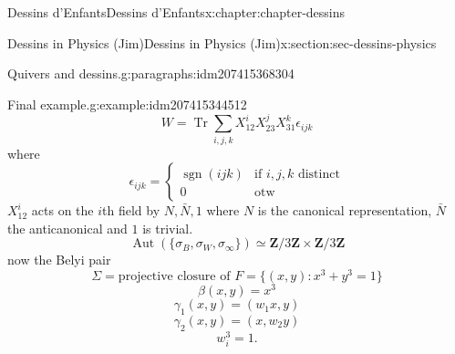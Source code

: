 \documentclass[oneside,10pt,]{book}
\numberwithin{equation}{section}
\newcommand{\ZZ}{\mathbf{Z}}
\DeclareMathOperator{\sgn}{sgn}
\DeclareMathOperator{\trace}{Tr}
\DeclareMathOperator{\Aut}{Aut}
\newcommand{\amp}{&}
\begin{document}
\begin{chapterptx}{Dessins d'Enfants}{}{Dessins d'Enfants}{}{}{x:chapter:chapter-dessins}
\begin{sectionptx}{Dessins in Physics (Jim)}{}{Dessins in Physics (Jim)}{}{}{x:section:sec-dessins-physics}
\begin{paragraphs}{Quivers and dessins.}{g:paragraphs:idm207415368304}
\begin{example}{Final example.}{g:example:idm207415344512}
\begin{equation*}
W = \trace \sum_{i,j,k} X_{12}^iX_{23}^j X_{31}^k \epsilon_{ijk}
\end{equation*}
where%
\begin{equation*}
\epsilon_{ijk} = \begin{cases} \sgn(ijk) \amp\text{if }i,j,k \text{ distinct}\\ 0 \amp\text{otw}\end{cases}
\end{equation*}
\(X_{12}^i\) acts on the \(i\)th field by \(N, \bar N, 1\) where \(N\) is the canonical representation, \(\bar N\) the anticanonical and \(1\) is trivial.%
\begin{equation*}
\Aut(\{\sigma_B,\sigma_W, \sigma_\infty\})  \simeq \ZZ/3\ZZ\times \ZZ/3\ZZ
\end{equation*}
now the Belyi pair%
\begin{equation*}
\Sigma = \text{projective closure of } F = \{(x,y) : x^3+ y^3 =1\}
\end{equation*}
%
\begin{equation*}
\beta(x,y) = x^3
\end{equation*}
%
\begin{equation*}
\gamma_1(x,y) = (w_1 x, y)
\end{equation*}
%
\begin{equation*}
\gamma_2(x,y) = (x,w_2  y)
\end{equation*}
%
\begin{equation*}
w_i^3 = 1\text{.}
\end{equation*}
%
\end{example}
\end{paragraphs}%
\end{sectionptx}
\end{chapterptx}
%
%
\typeout{************************************************}
\typeout{************************************************}
%
\end{document}
